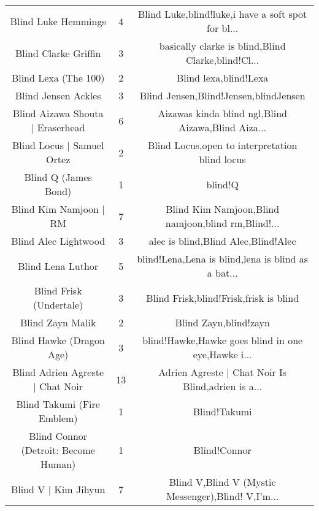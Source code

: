 \begin{table}[h!]
{\begin{tabular}{|c|c|c|}
                               Blind Luke Hemmings &      4 & Blind Luke,blind!luke,i have a soft spot for bl... \\
                              Blind Clarke Griffin &      3 & basically clarke is blind,Blind Clarke,blind!Cl... \\
                              Blind Lexa (The 100) &      2 &                              Blind lexa,blind!Lexa \\
                               Blind Jensen Ackles &      3 &              Blind Jensen,Blind!Jensen,blindJensen \\
                  Blind Aizawa Shouta | Eraserhead &      6 & Aizawas kinda blind ngl,Blind Aizawa,Blind Aiza... \\
                        Blind Locus | Samuel Ortez &      2 &     Blind Locus,open to interpretation blind locus \\
                              Blind Q (James Bond) &      1 &                                            blind!Q \\
                            Blind Kim Namjoon | RM &      7 & Blind Kim Namjoon,Blind namjoon,blind rm,Blind!... \\
                              Blind Alec Lightwood &      3 &                alec is blind,Blind Alec,Blind!Alec \\
                                 Blind Lena Luthor &      5 & blind!Lena,Lena is blind,lena is blind as a bat... \\
                           Blind Frisk (Undertale) &      3 &             Blind Frisk,blind!Frisk,frisk is blind \\
                                  Blind Zayn Malik &      2 &                              Blind Zayn,blind!zayn \\
                          Blind Hawke (Dragon Age) &      3 & blind!Hawke,Hawke goes blind in one eye,Hawke i... \\
                  Blind Adrien Agreste | Chat Noir &     13 & Adrien Agreste | Chat Noir Is Blind,adrien is a... \\
                        Blind Takumi (Fire Emblem) &      1 &                                       Blind!Takumi \\
              Blind Connor (Detroit: Become Human) &      1 &                                       Blind!Connor \\
                              Blind V | Kim Jihyun &      7 & Blind V,Blind V (Mystic Messenger),Blind! V,I'm... \\

\end{tabular}}
\end{table}
